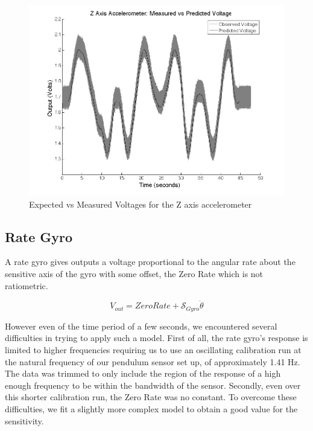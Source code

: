 \documentclass{article}
\theoremstyle{plain}
\theoremstyle{definition}
\theoremstyle{remark}
\newcommand{\Sens}{\mathcal{S}}
\begin{document}
\begin{figure}
\begin{center}
\includegraphics[width = 13cm]{ZaxisAccel_Calib.png}
\caption{Expected vs Measured Voltages for the Z axis accelerometer}
\label{ZaccelCalib}
\end{center}
\end{figure}

\subsection*{Rate Gyro}


A rate gyro gives outputs a voltage proportional to the angular rate about the sensitive axis of the gyro with some offset, the Zero Rate which is not ratiometric.  

$$V_{out} = ZeroRate + \Sens_{Gyro} \dot{\theta} $$

However even of the time period of a few seconds, we encountered several difficulties in trying to apply such a model.  First of all, the rate gyro's response is limited to higher frequencies requiring us to use an oscillating calibration run at the natural frequency of our pendulum sensor set up, of approximately 1.41 Hz.  The data was trimmed to only include the region of the response of a high enough frequency to be within the bandwidth of the sensor.  Secondly, even over this shorter calibration run, the Zero Rate was no constant.  To overcome these difficulties, we fit a slightly more complex model to obtain a good value for the sensitivity.
\end{document}
